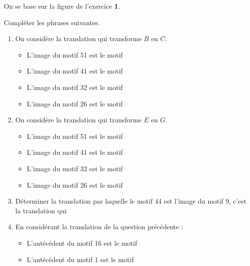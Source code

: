 \begin{exercice*}
    On se base sur la figure de l'exercice {\bfseries 1}.
    
    \Reseau[%
    Colonnes=5,%
    Lignes=8,%
    Traces={%
        pair A,B,C,D,E,F,G,H; %
        A=ppreseau(0,8);
        B=ppreseau(1,8);
        C=ppreseau(1,7);
        D=ppreseau(0,7);
        E=ppreseau(2,5);
        F=ppreseau(1,2);
        G=ppreseau(3,2);
        H=ppreseau(4,6);
        marque_p:="croix";
        drawoptions(withcolor red);
        pointe(A,B,C,D,E,F,G,H);
        label.urt(btex $A$ etex,A);
        label.urt(btex $B$ etex,B);
        label.urt(btex $C$ etex,C);
        label.urt(btex $D$ etex,D);
        label.urt(btex $E$ etex,E);
        label.urt(btex $F$ etex,F);
        label.urt(btex $G$ etex,G);
        label.urt(btex $H$ etex,H);
        drawoptions();
    }]{}

    Compléter les phrases suivantes.
    \begin{enumerate}
        \item On considère la translation qui transforme $B$ en $C$.
        \begin{itemize}
            \item L'image du motif \num{51} est le motif \pointilles
            \item L'image du motif \num{41} est le motif \pointilles
            \item L'image du motif \num{32} est le motif \pointilles
            \item L'image du motif \num{26} est le motif \pointilles
        \end{itemize}
        \item On considère la translation qui transforme $E$ en $G$.
        \begin{itemize}
            \item L'image du motif \num{51} est le motif \pointilles
            \item L'image du motif \num{41} est le motif \pointilles
            \item L'image du motif \num{32} est le motif \pointilles
            \item L'image du motif \num{26} est le motif \pointilles
        \end{itemize}
        \item Déterminer la translation par laquelle le motif \num{44} est l'image du motif \num{9}, c'est la translation qui 
        
        \pointilles
        \item En considérant la translation de la question précédente :
        \begin{itemize}
            \item L'antécédent du motif \num{16} est le motif \pointilles
            \item L'antécédent du motif \num{1} est le motif \pointilles
        \end{itemize}
    \end{enumerate}
\end{exercice*}

